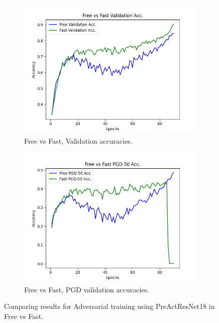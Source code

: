 \documentclass{article}
\begin{document}
\newpage
\begin{figure}[hbt!]
  \centering
  \begin{subfigure}[b]{0.4\linewidth}
    \includegraphics[width=\linewidth]{images/preComp/Figure_1.png}
    \caption{ Free vs Fast, Validation accuracies.}
  \end{subfigure}
  \begin{subfigure}[b]{0.4\linewidth}
    \includegraphics[width=\linewidth]{images/preComp/Figure_2.png}
    \caption{Free vs Fast, PGD validation accuracies.}
  \end{subfigure}
  \caption{Comparing results for Adversarial training using PreActResNet18 in Free vs Fast.}
  \label{fig:coffee}
\end{figure}
\end{document}
